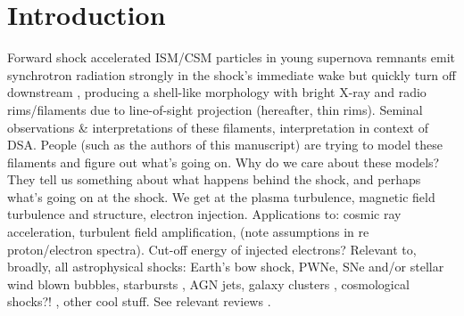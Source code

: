 \documentclass[iop, apj, numberedappendix, twocolappendix]{emulateapj}
\begin{document}
\section{Introduction}


Forward shock accelerated ISM/CSM particles in young supernova remnants emit
synchrotron radiation strongly in the shock's immediate wake but quickly turn
off downstream \citep{koyama1995, reynolds1996}, producing a shell-like
morphology with bright X-ray and radio rims/filaments due to line-of-sight
projection (hereafter, thin rims).
Seminal observations \& interpretations of these filaments, interpretation in
context of DSA.
People (such as the authors of this manuscript) are trying to model these
filaments and figure out what's going on.
Why do we care about these models?  They tell us something about what happens
behind the shock, and perhaps what's going on at the shock.  We get at the
plasma turbulence, magnetic field turbulence and structure, electron injection.
Applications to: cosmic ray acceleration, turbulent field amplification, (note
assumptions in re proton/electron spectra).  Cut-off energy of injected
electrons?  Relevant to, broadly, all astrophysical shocks: Earth's bow shock,
PWNe, SNe and/or stellar wind blown bubbles, starbursts \citep{heckman1990},
AGN jets, galaxy clusters \citep{van-weeren2010}, cosmological shocks?!
\citep{miniati2000, ryu2008}, other cool stuff.  See relevant reviews
\citep{blandford1987}.
\end{document}
